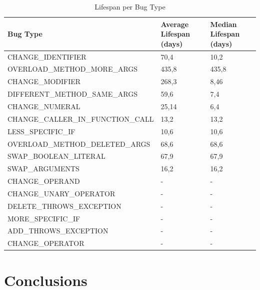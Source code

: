 \documentclass[10pt,conference]{IEEEtran}
\begin{document}
\begin{table}[]
\centering
\begin{tabular}{lll}
\hline
Bug Type                           & Average Lifespan (days) & Median Lifespan (days) \\ \hline
CHANGE\_IDENTIFIER                 & 70,4                    & 10,2                   \\
OVERLOAD\_METHOD\_MORE\_ARGS       & 435,8                   & 435,8                  \\
CHANGE\_MODIFIER                   & 268,3                   & 8,46                   \\
DIFFERENT\_METHOD\_SAME\_ARGS      & 59,6                    & 7,4                    \\
CHANGE\_NUMERAL                    & 25,14                   & 6,4                    \\
CHANGE\_CALLER\_IN\_FUNCTION\_CALL & 13,2                    & 13,2                   \\
LESS\_SPECIFIC\_IF                 & 10,6                    & 10,6                   \\
OVERLOAD\_METHOD\_DELETED\_ARGS    & 68,6                    & 68,6                   \\
SWAP\_BOOLEAN\_LITERAL             & 67,9                    & 67,9                   \\
SWAP\_ARGUMENTS                    & 16,2                    & 16,2                   \\
CHANGE\_OPERAND                    & -                       & -                      \\
CHANGE\_UNARY\_OPERATOR            & -                       & -                      \\
DELETE\_THROWS\_EXCEPTION          & -                       & -                      \\
MORE\_SPECIFIC\_IF                 & -                       & -                      \\
ADD\_THROWS\_EXCEPTION             & -                       & -                      \\
CHANGE\_OPERATOR                   & -                       & -                      \\ \hline
\end{tabular}
\caption{Lifespan per Bug Type}
\label{tab:lifespan}
\end{table}


\section{Conclusions}

\printbibliography
\end{document}
